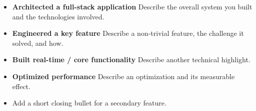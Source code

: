 \begin{itemize}
  \item \textbf{Architected a full-stack application} Describe the overall system you built and the technologies involved.
  \item \textbf{Engineered a key feature} Describe a non-trivial feature, the challenge it solved, and how.
  \item \textbf{Built real-time / core functionality} Describe another technical highlight.
  \item \textbf{Optimized performance} Describe an optimization and its measurable effect.
  \item Add a short closing bullet for a secondary feature.
\end{itemize}
